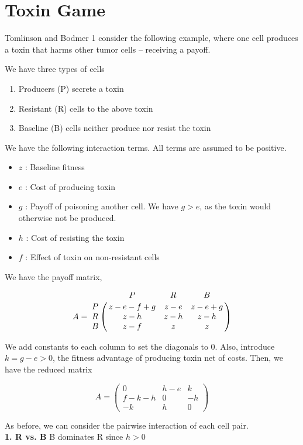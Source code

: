 \documentclass[12pt]{report}
\begin{document}
\section*{Toxin Game}
Tomlinson and Bodmer \cite{TomBod}1 consider the following example, where one cell produces a toxin that harms other tumor cells -- receiving a payoff. 

We have three types of cells
\begin{enumerate}
\item Producers (P) secrete a toxin
\item Resistant (R) cells to the above toxin
\item Baseline (B) cells neither produce nor resist the toxin
\end{enumerate}

We have the following interaction terms. All terms are assumed to be positive.
\begin{itemize}
\item $z$ : Baseline fitness
\item $e$ : Cost of producing toxin
\item $g$ :  Payoff of poisoning another cell. We have $g > e$, as the toxin would otherwise not be produced.
\item $h$ :  Cost of resisting the toxin
\item $f$ : Effect of toxin on non-resistant cells
\end{itemize}


We have the payoff matrix, 

$$A = \bordermatrix{\text{}& P & R & B\cr
                P & z - e - f + g & z - e & z - e + g \cr
                R & z - h  &  z - h & z - h \cr
                B & z - f & z & z \cr
               }$$

We add constants to each column to set the diagonals to 0. Also, introduce $k = g - e > 0$, the fitness advantage of producing toxin net of costs. Then, we have the reduced matrix


$$ A = \begin{pmatrix}
0 & h - e& k \\
f - k - h & 0 & -h \\
- k & h & 0
\end{pmatrix} $$

As before, we can consider the pairwise interaction of each cell pair. \\

\textbf{1. R vs. B} B dominates R since $h > 0$ \\
\end{document}
